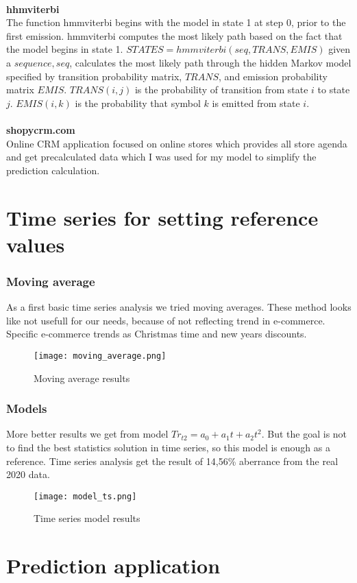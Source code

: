 \\
\textbf{hhmviterbi}~\cite{hhmviterbi}\\
The function hmmviterbi begins with the model in state 1 at step 0, prior to the first emission.
hmmviterbi computes the most likely path based on the fact that the model begins in state 1.
$STATES = hmmviterbi(seq,TRANS,EMIS)$ given a $sequence, seq$, calculates the most likely path through the hidden Markov model
specified by transition probability matrix, $TRANS$, and emission probability matrix $EMIS$. $TRANS(i,j)$ is the probability of transition from state $i$ to state $j$.
$EMIS(i,k)$ is the probability that symbol $k$ is emitted from state $i$.\\
\\
\textbf{shopycrm.com}\\
Online CRM application focused on online stores which provides all store agenda and get precalculated data which I was used for my model to simplify the prediction calculation.
\section{Time series for setting reference values}
\subsubsection{Moving average}
As a first basic time series analysis we tried moving averages. These method looks like not usefull for our needs,
because of not reflecting trend in e-commerce. Specific e-commerce trends as Christmas time and new years discounts.
\begin{figure}[h!]
    \begin{center}
        \texttt{[image: moving\_average.png]}
    \end{center}
    \caption{Moving average results}
    \label{Time series moving average}
\end{figure}
\newpage
\subsubsection{Models}
More better results we get from model $Tr_{t2}=a_0+a_1t+a_2t^2$. But the goal is not to find the best
statistics solution in time series, so this model is enough as a reference. Time series analysis get the
result of 14,56\% aberrance from the real 2020 data.
\begin{figure}[h!]
    \begin{center}
        \texttt{[image: model\_ts.png]}
    \end{center}
    \caption{Time series model results}
    \label{Time series model's}
\end{figure}
\section{Prediction application} \label{sec:app}
